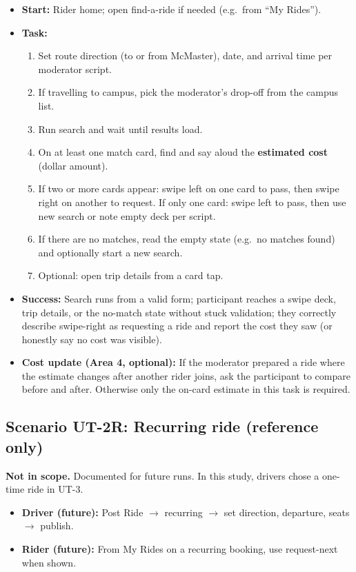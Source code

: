 \begin{itemize}
  \item \textbf{Start:} Rider home; open find-a-ride if needed (e.g.\ from ``My Rides'').
  \item \textbf{Task:}
  \begin{enumerate}
    \item Set route direction (to or from McMaster), date, and arrival time per moderator script.
    \item If travelling to campus, pick the moderator's drop-off from the campus list.
    \item Run search and wait until results load.
    \item On at least one match card, find and say aloud the \textbf{estimated cost} (dollar amount).
    \item If two or more cards appear: swipe left on one card to pass, then swipe right on another to request. If only one card: swipe left to pass, then use new search or note empty deck per script.
    \item If there are no matches, read the empty state (e.g.\ no matches found) and optionally start a new search.
    \item Optional: open trip details from a card tap.
  \end{enumerate}
  \item \textbf{Success:} Search runs from a valid form; participant reaches a swipe deck, trip details, or the no-match state without stuck validation; they correctly describe swipe-right as requesting a ride and report the cost they saw (or honestly say no cost was visible).
  \item \textbf{Cost update (Area 4, optional):} If the moderator prepared a ride where the estimate changes after another rider joins, ask the participant to compare before and after. Otherwise only the on-card estimate in this task is required.
\end{itemize}

\subsection{Scenario UT-2R: Recurring ride (reference only)}

\textbf{Not in scope.} Documented for future runs. In this study, drivers chose a one-time ride in UT-3.

\begin{itemize}
  \item \textbf{Driver (future):} Post Ride $\rightarrow$ recurring $\rightarrow$ set direction, departure, seats $\rightarrow$ publish.
  \item \textbf{Rider (future):} From My Rides on a recurring booking, use request-next when shown.
\end{itemize}

